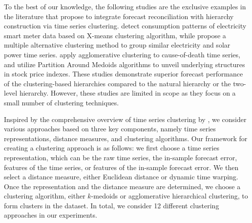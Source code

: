 \documentclass[a4paper,review,12pt,authoryear]{elsarticle}
\begin{document}
To the best of our knowledge, the following studies are the exclusive examples in the literature that propose to integrate forecast reconciliation with hierarchy construction via time series clustering.
\cite{pangHierarchicalElectricityTime2018} detect consumption patterns of electricity smart meter data based on X-means clustering algorithm, while \cite{pangHierarchicalElectricityTime2022} propose a multiple alternative clustering method to group similar electricity and solar power time series. 
\cite{liForecastReconciliationApproach2019} apply agglomerative clustering to cause-of-death time series, and
\cite{matteraImprovingOutofSampleForecasts2023} utilize Partition Around Medoids algorithms to unveil underlying structures in stock price indexes. 
These studies demonstrate superior forecast performance of the clustering-based hierarchies compared to the natural hierarchy or the two-level hierarchy.
However, these studies are limited in scope as they focus on a small number of  clustering techniques. 


Inspired by the comprehensive overview of time series clustering by \cite{aghabozorgiTimeseriesClusteringDecade2015a}, we consider various approaches based on three key components, namely time series representations, distance measures, and clustering algorithms. Our framework for creating a clustering approach is as follows: we first choose a time series representation, which can be the raw time series, the in-sample forecast error, features of the time series, or features of the in-sample forecast error. We then select a distance measure, either Euclidean distance or dynamic time warping. Once the representation and the distance measure are determined, we choose a clustering algorithm, either $k$-medoids or agglomerative hierarchical clustering, to form clusters in the dataset. In total, we consider 12 different clustering approaches in our experiments.





\end{document}
